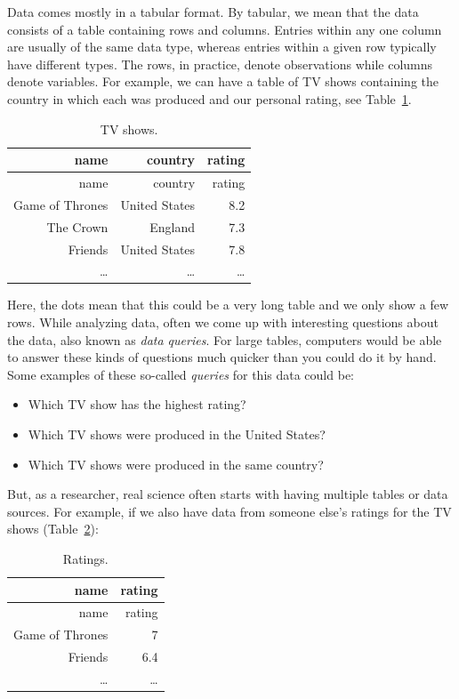 \documentclass[
  notoc %
]{tufte-book}
\providecommand{\tightlist}{%
  \setlength{\itemsep}{0pt}\setlength{\parskip}{0pt}
}
\begin{document}
Data comes mostly in a tabular format. By tabular, we mean that the data
consists of a table containing rows and columns. Entries within any one
column are usually of the same data type, whereas entries within a given
row typically have different types. The rows, in practice, denote
observations while columns denote variables. For example, we can have a
table of TV shows containing the country in which each was produced and
our personal rating, see Table~\ref{tbl:TV_shows}.

\hypertarget{tbl:TV_shows}{}
\begin{longtable}[]{@{}rrr@{}}
\caption{\label{tbl:TV_shows}TV shows.}\tabularnewline
\toprule()
name & country & rating \\
\midrule()
\endfirsthead
\toprule()
name & country & rating \\
\midrule()
\endhead
Game of Thrones & United States & 8.2 \\
The Crown & England & 7.3 \\
Friends & United States & 7.8 \\
\ldots{} & \ldots{} & \ldots{} \\
\bottomrule()
\end{longtable}

Here, the dots mean that this could be a very long table and we only
show a few rows. While analyzing data, often we come up with interesting
questions about the data, also known as \emph{data queries}. For large
tables, computers would be able to answer these kinds of questions much
quicker than you could do it by hand. Some examples of these so-called
\emph{queries} for this data could be:

\begin{itemize}
\tightlist
\item
  Which TV show has the highest rating?
\item
  Which TV shows were produced in the United States?
\item
  Which TV shows were produced in the same country?
\end{itemize}

But, as a researcher, real science often starts with having multiple
tables or data sources. For example, if we also have data from someone
else's ratings for the TV shows (Table~\ref{tbl:ratings}):

\hypertarget{tbl:ratings}{}
\begin{longtable}[]{@{}rr@{}}
\caption{\label{tbl:ratings}Ratings.}\tabularnewline
\toprule()
name & rating \\
\midrule()
\endfirsthead
\toprule()
name & rating \\
\midrule()
\endhead
Game of Thrones & 7 \\
Friends & 6.4 \\
\ldots{} & \ldots{} \\
\bottomrule()
\end{longtable}
\end{document}
